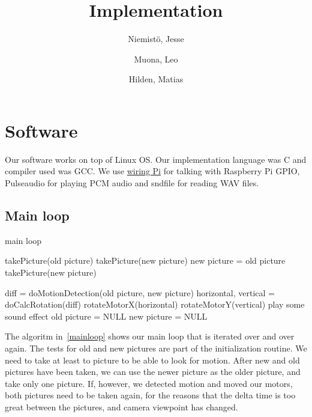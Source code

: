 \documentclass[english,11pt,twoside,a4paper]{article}
\begin{document}
\author{
  Niemistö, Jesse
  \and
  Muona, Leo
  \and
  Hilden, Matias
}
\title{Implementation}

\maketitle

\section{Software}

Our software works on top of Linux OS. Our implementation language was C and compiler used was GCC. We use \href{https://projects.drogon.net/raspberry-pi/wiringpi/}{wiring Pi} for talking with Raspberry Pi GPIO, Pulseaudio for playing PCM audio and sndfile for reading WAV files.

\subsection{Main loop}

\begin{algorithm}
  \label{mainloop}
  \caption{main loop}
  \begin{algorithmic}
      \STATE takePicture(old picture)
      \STATE takePicture(new picture)
    \ELSE
      \STATE new picture = old picture
      \STATE takePicture(new picture)
    \ENDIF

      \STATE diff = doMotionDetection(old picture, new picture)
        \STATE horizontal, vertical = doCalcRotation(diff)
        \STATE rotateMotorX(horizontal)
        \STATE rotateMotorY(vertical)
          \STATE play some sound effect
        \ENDIF
	\STATE old picture = NULL
	\STATE new picture = NULL
      \ENDIF
    \ENDIF
  \end{algorithmic}
\end{algorithm}

The algoritm in~\ref{mainloop} shows our main loop that is iterated over and over again. The tests for old and new pictures are part of the initialization routine. We need to take at least to picture to be able to look for motion. After new and old pictures have been taken, we can use the newer picture as the older picture, and take only one picture. If, however, we detected motion and moved our motors, both pictures need to be taken again, for the reasons that the delta time is too great between the pictures, and camera viewpoint has changed.
\end{document}

